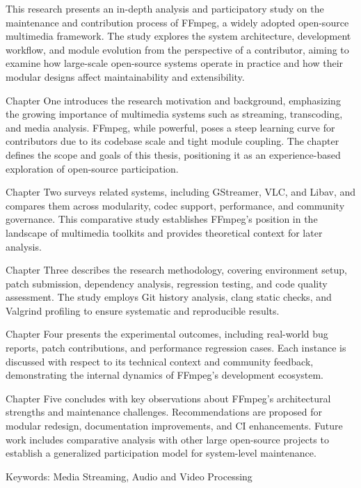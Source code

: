 \newpage
{}
\normalsize


This research presents an in-depth analysis and participatory study on the maintenance and contribution process of FFmpeg, a widely adopted open-source multimedia framework. The study explores the system architecture, development workflow, and module evolution from the perspective of a contributor, aiming to examine how large-scale open-source systems operate in practice and how their modular designs affect maintainability and extensibility.

Chapter One introduces the research motivation and background, emphasizing the growing importance of multimedia systems such as streaming, transcoding, and media analysis. FFmpeg, while powerful, poses a steep learning curve for contributors due to its codebase scale and tight module coupling. The chapter defines the scope and goals of this thesis, positioning it as an experience-based exploration of open-source participation.

Chapter Two surveys related systems, including GStreamer, VLC, and Libav, and compares them across modularity, codec support, performance, and community governance. This comparative study establishes FFmpeg’s position in the landscape of multimedia toolkits and provides theoretical context for later analysis.

Chapter Three describes the research methodology, covering environment setup, patch submission, dependency analysis, regression testing, and code quality assessment. The study employs Git history analysis, clang static checks, and Valgrind profiling to ensure systematic and reproducible results.

Chapter Four presents the experimental outcomes, including real-world bug reports, patch contributions, and performance regression cases. Each instance is discussed with respect to its technical context and community feedback, demonstrating the internal dynamics of FFmpeg’s development ecosystem.

Chapter Five concludes with key observations about FFmpeg’s architectural strengths and maintenance challenges. Recommendations are proposed for modular redesign, documentation improvements, and CI enhancements. Future work includes comparative analysis with other large open-source projects to establish a generalized participation model for system-level maintenance.

Keywords: Media Streaming, Audio and Video Processing